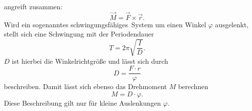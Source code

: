 angreift zusammen:
\begin{equation}
    \vec M=\vec F\times\vec r.
\end{equation}
Wird ein sogenanntes \glqq schwingungsfähiges\grqq\, System um einen Winkel $\varphi$ ausgelenkt,
stellt sich eine Schwingung mit der  Periodendauer 
\begin{equation}
    T=2\pi\sqrt{\frac{I}{D}}.
    \label{eq:Schwingungsdauer}
\end{equation}
$D$ ist hierbei die Winkelrichtgröße und lässt sich durch 
\begin{equation}
    D=\frac{F\cdot r}{\varphi} 
\end{equation}
beschreiben. Damit lässt sich ebenso das Drehmoment $M$ berechnen 
\begin{equation}
    M=D\cdot \varphi.
\end{equation}
Diese Beschreibung gilt nur für kleine Auslenkungen $\varphi$.